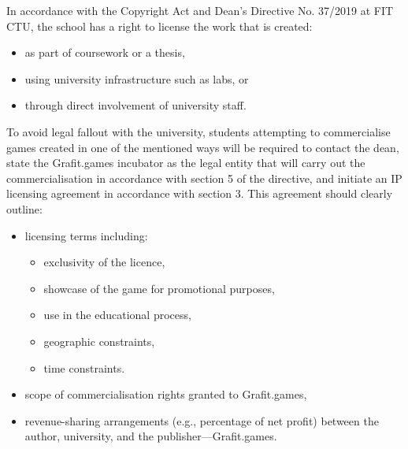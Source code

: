 In accordance with the Copyright Act and Dean’s Directive No. 37/2019 at FIT CTU, the school has a right to license the work that is created:
\begin{itemize}
    \item as part of coursework or a thesis,
    \item using university infrastructure such as labs, or
    \item through direct involvement of university staff. \cite{Kurzy_autorsky-zakon, FIT-smernice}
\end{itemize}
To avoid legal fallout with the university, students attempting to commercialise games created in one of the mentioned ways will be required to contact the dean, state the Grafit.games incubator as the legal entity that will carry out the commercialisation in accordance with section 5 of the directive, and initiate an IP licensing agreement in accordance with section 3. This agreement should clearly outline:
\begin{itemize}
    \item licensing terms including:
    \begin{itemize}
        \item exclusivity of the licence,
        \item showcase of the game for promotional purposes,
        \item use in the educational process,
        \item geographic constraints,
        \item time constraints.
    \end{itemize}
    \item scope of commercialisation rights granted to Grafit.games,
    \item revenue-sharing arrangements (e.g., percentage of net profit) between the author, university, and the publisher---Grafit.games. \cite{FIT-smernice}
\end{itemize}
